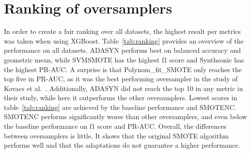 \begin{table}[]
\centering
{}
\caption{Amount of highest f1-scores achieved per oversampler by proportion.}
\label{tab:prop}
\end{table}


\section{Ranking of oversamplers}
In order to create a fair ranking over all datasets, the highest result per metrics was taken when using XGBoost. Table~\ref{tab:ranking} provides an overview of the performance on all datasets. ADASYN performs best on balanced accuracy and geometric mean, while SVMSMOTE has the highest f1 score and Synthsonic has the highest PR-AUC. A surprise is that Polynom\_fit\_SMOTE only reaches the top five in PR-AUC, as it was the best performing oversampler in the study of Kovacs et al.~\cite{Kovacs2019AnDatasets}. Additionally, ADASYN did not reach the top 10 in any metric in their study, while here it outperforms the other oversamplers. Lowest scores in table~\ref{tab:ranking} are achieved by the baseline performance and SMOTENC. SMOTENC performs significantly worse than other oversamplers, and even below the baseline performance on f1 score and PR-AUC. Overall, the differences between oversamplers is little. It shows that the original SMOTE algorithm performs well and that the adaptations do not guarantee a higher performance.

